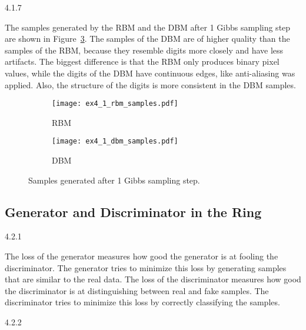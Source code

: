 \begin{task}{4.1.7}
\end{task}

The samples generated by the RBM and the DBM after 1 Gibbs sampling step are shown in
Figure~\ref{fig:ex4_1_samples}. The samples of the DBM are of higher quality than the samples of the
RBM, because they resemble digits more closely and have less artifacts. The biggest difference is
that the RBM only produces binary pixel values, while the digits of the DBM have continuous edges,
like anti-aliasing was applied. Also, the structure of the digits is more consistent in the DBM
samples.

\begin{figure}[ht]
  \centering
  \begin{subfigure}{0.4\textwidth}
    \texttt{[image: ex4\_1\_rbm\_samples.pdf]}
    \caption{RBM}
    \label{fig:ex4_1_rbm_samples}
  \end{subfigure}
  \begin{subfigure}{0.4\textwidth}
    \texttt{[image: ex4\_1\_dbm\_samples.pdf]}
    \caption{DBM}
    \label{fig:ex4_1_dbm_samples}
  \end{subfigure}
  \caption{Samples generated after 1 Gibbs sampling step.}
  \label{fig:ex4_1_samples}
\end{figure}



\subsection{Generator and Discriminator in the Ring}
\label{ex:4.2}

\begin{task}{4.2.1}
\end{task}

The loss of the generator measures how good the generator is at fooling the discriminator. The
generator tries to minimize this loss by generating samples that are similar to the real data. The
loss of the discriminator measures how good the discriminator is at distinguishing between real and
fake samples. The discriminator tries to minimize this loss by correctly classifying the samples.


\begin{task}{4.2.2}
\end{task}

